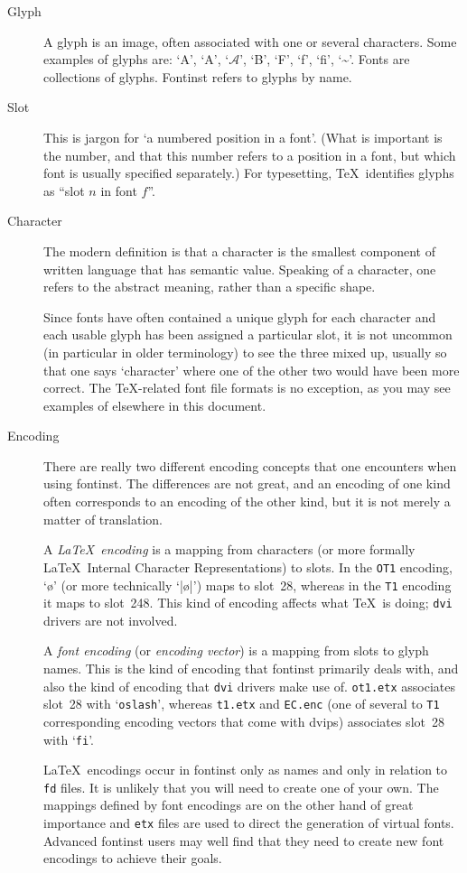 \documentclass[a4paper]{ltxguide}
\newcommand*{\setfilename}[1]{\texttt{#1}}
\newcommand*{\setpackagename}[1]{\textsf{#1}}
\newcommand{\dvips}   {\setpackagename{dvips}\xspace}
\newcommand{\fontinst}{\setpackagename{font\-inst}\xspace}
\newcommand{\Fontinst}{\setpackagename{Font\-inst}\xspace}
\newcommand{\fd} {\setfilename{fd}\xspace}
\newcommand{\etx}{\setfilename{etx}\xspace}
\newcommand{\dvi}{\setfilename{dvi}\xspace}
\begin{document}
\begin{description}
\item[Glyph] 
  A glyph is an image, often associated with one or several characters. 
  Some examples of glyphs are: 
  `A', `\textsf{A}', `$\mathcal{A}$', `B', `F', 
  `{f}', 
  `{fi}', `\~{}'.
  Fonts are collections of glyphs. \Fontinst refers to glyphs by name.
\item[Slot] 
  This is jargon for `a numbered position in a font'. (What is 
  important is the number, and that this number refers to a position 
  in a font, but which font is usually specified separately.) 
  For typesetting, \TeX\ identifies glyphs as ``slot $n$ in font $f$''.
\item[Character]
  The modern definition is that a character is the smallest component 
  of written language that has semantic value. Speaking of a 
  character, one refers to the abstract meaning, rather 
  than a specific shape.
  
  Since fonts have often contained a unique glyph for each character 
  and each usable glyph has been assigned a particular slot, 
  it is not uncommon (in particular in older terminology) to see the 
  three mixed up, usually so that one says `character' where one of 
  the other two would have been more correct. The \TeX-related font 
  file formats is no exception, as you may see examples of elsewhere 
  in this document.
\item[Encoding] 
  There are really two different encoding concepts that one encounters 
  when using \fontinst. The differences are not great, and an 
  encoding of one kind often corresponds to an encoding of the other 
  kind, but it is not merely a matter of translation.
  
  A \emph{\LaTeX\ encoding} is a mapping from characters (or more 
  formally \LaTeX\ Internal Character Representations) to slots. 
  In the \texttt{OT1} encoding, `\o' (or more technically `|\o|') maps 
  to slot~28, whereas in the \texttt{T1} encoding it maps to slot~248. 
  This kind of encoding affects what \TeX\ is doing; \dvi drivers are 
  not involved.
  
  A \emph{font encoding} (or \emph{encoding vector}) is a mapping from 
  slots to glyph names. This is the kind of encoding that \fontinst 
  primarily deals with, and also the kind of encoding that \dvi 
  drivers make use of. \texttt{ot1.etx} associates slot~28 with 
  `\texttt{oslash}', whereas \texttt{t1.etx} and \texttt{EC.enc} (one 
  of several to \texttt{T1} corresponding encoding vectors that come 
  with \dvips) associates slot~28 with `\texttt{fi}'.
  
  \LaTeX\ encodings occur in \fontinst only as names and only in 
  relation to \fd files. It is unlikely that you will need to create 
  one of your own. The mappings defined by font encodings are on the 
  other hand of great importance and \etx files are used to direct 
  the generation of virtual fonts. Advanced \fontinst users may well 
  find that they need to create new font encodings to achieve their 
  goals.
\end{description}
\end{document}
